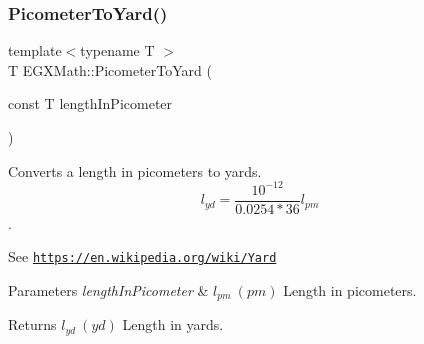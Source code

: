 \subsubsection{\texorpdfstring{Picometer\+To\+Yard()}{PicometerToYard()}}
{\footnotesize\ttfamily template$<$typename T $>$ \\
T E\+G\+X\+Math\+::\+Picometer\+To\+Yard (\begin{DoxyParamCaption}\item[{const T}]{length\+In\+Picometer }\end{DoxyParamCaption})}



Converts a length in picometers to yards. \[ l_{yd}= \frac{10^{-12}}{0.0254 * 36} l_{pm} \]. 

See \href{https://en.wikipedia.org/wiki/Yard}{\tt https\+://en.\+wikipedia.\+org/wiki/\+Yard} 
\begin{DoxyParams}{Parameters}
{\em length\+In\+Picometer} & $ l_{pm}\ (pm)$ Length in picometers. \\
\hline
\end{DoxyParams}
\begin{DoxyReturn}{Returns}
$ l_{yd}\ (yd)$ Length in yards. 
\end{DoxyReturn}
